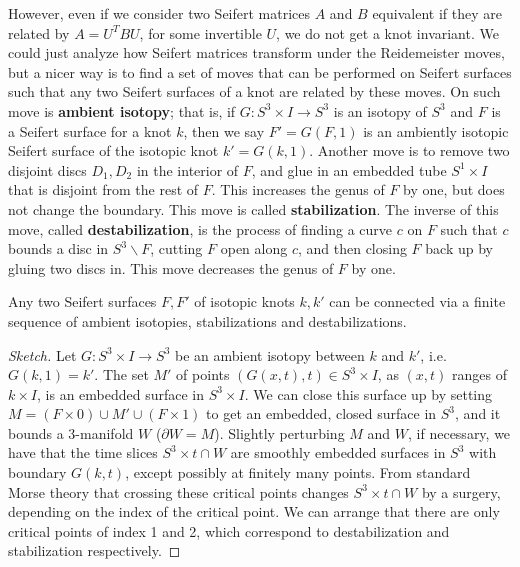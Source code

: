However, even if we consider two Seifert matrices $A$ and $B$ equivalent if they are related by $A=U^TBU$, for some invertible $U$, we do not get a knot invariant. We could just analyze how Seifert matrices transform under the Reidemeister moves, but a nicer way is to find a set of moves that can be performed on Seifert surfaces such that any two Seifert surfaces of a knot are related by these moves. On such move is \textbf{ambient isotopy}; that is, if $G : S^3 \times I \rightarrow S^3$ is an isotopy of $S^3$ and $F$ is a Seifert surface for a knot $k$, then we say $F' = G(F,1)$ is an ambiently isotopic Seifert surface of the isotopic knot $k' = G(k,1)$. Another move is to remove two disjoint discs $D_1,D_2$ in the interior of $F$, and glue in an embedded tube $S^1 \times I$ that is disjoint from the rest of $F$. This increases the genus of $F$ by one, but does not change the boundary. This move is called \textbf{stabilization}. The inverse of this move, called \textbf{destabilization}, is the process of finding a curve $c$ on $F$ such that $c$ bounds a disc in $S^3 \backslash F$, cutting $F$ open along $c$, and then closing $F$ back up by gluing two discs in. This move decreases the genus of $F$ by one.
\begin{prop}
\label{stabilization of Seifert surfaces}
Any two Seifert surfaces $F,F'$ of isotopic knots $k,k'$ can be connected via a finite sequence of ambient isotopies, stabilizations and destabilizations.
\end{prop}
\begin{proof}[Sketch]
Let $G : S^3 \times I \rightarrow S^3$ be an ambient isotopy between $k$ and $k'$, i.e. $G(k,1) = k'$. The set $M'$ of points $(G(x,t),t) \in S^3 \times I$, as $(x,t)$ ranges of $k \times I$, is an embedded surface in $S^3 \times I$. We can close this surface up by setting $M = (F \times 0) \cup M' \cup (F \times 1)$ to get an embedded, closed surface in $S^3$, and it bounds a 3-manifold $W$ ($\partial W = M$). Slightly perturbing $M$ and $W$, if necessary, we have that the time slices $S^3 \times t \cap W$ are smoothly embedded surfaces in $S^3$ with boundary $G(k,t)$, except possibly at finitely many points. From standard Morse theory that crossing these critical points changes $S^3 \times t \cap W$ by a surgery, depending on the index of the critical point. We can arrange that there are only critical points of index 1 and 2, which correspond to destabilization and stabilization respectively. 
\end{proof}

